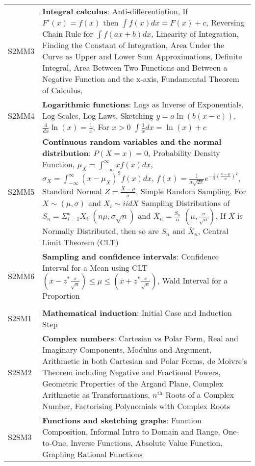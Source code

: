 \documentclass[varwidth=144mm, 12pt]{standalone}
\begin{document}
\begin{longtable}{lp{}}
S2MM3 & \textbf{Integral calculus}: Anti-differentiation, If $F'(x) = f(x)$ then $\int{f(x)dx} = F(x) + c$, Reversing Chain Rule for $\int{f(ax + b)dx}$, Linearity of Integration, Finding the Constant of Integration, Area Under the Curve as Upper and Lower Sum Approximations, Definite Integral, Area Between Two Functions and Between a Negative Function and the x-axis, Fundamental Theorem of Calculus,  \\
S2MM4 & \textbf{Logarithmic functions}: Logs as Inverse of Exponentials, Log-Scales, Log Laws, Sketching $y = a\ln(b(x-c))$, $\frac{d}{dx}\ln(x) = \frac{1}{x}$, For $x > 0$ $\int{\frac{1}{x}dx} = \ln(x) + c$ \\
S2MM5 & \textbf{Continuous random variables and the normal distribution}: $P(X = x) = 0$, Probability Density Function, $\mu_X = \int_{-\infty}^{\infty}{xf(x)dx}$, $\sigma_X = \int_{-\infty}^{\infty}{(x - \mu_X)^2f(x)dx}$, $f(x) = \frac{1}{\sigma\sqrt{2\pi}}e^{-\frac{1}{2}\left( \frac{x-\mu}{\sigma}\right)^2}$, Standard Normal $Z = \frac{X - \mu}{\sigma}$, Simple Random Sampling, For $X \sim (\mu, \sigma)$ and $X_i \sim iid X$ Sampling Distributions of $S_n = \Sigma_{i = 1}^{n}{X_i}$ $(n\mu,\sigma\sqrt{n})$ and $\bar{X}_n = \frac{S_n}{n}$ $(\mu,\frac{\sigma}{\sqrt{n}})$, If $X$ is Normally Distributed, then so are $S_n$ and $\bar{X}_n$, Central Limit Theorem (CLT) \\
S2MM6 & \textbf{Sampling and confidence intervals}: Confidence Interval for a Mean using CLT $\left(\bar{x} - z^*\frac{s}{\sqrt{n}} \right) \leq \mu \leq \left( \bar{x} + z^*\frac{s}{\sqrt{n}}\right)$, Wald Interval for a Proportion  \\
& \\
S2SM1 & \textbf{Mathematical induction}: Initial Case and Induction Step \\
S2SM2 & \textbf{Complex numbers}: Cartesian vs Polar Form, Real and Imaginary Components, Modulus and Argument, Arithmetic in both Cartesian and Polar Forms, de Moivre's Theorem including Negative and Fractional Powers, Geometric Properties of the Argand Plane, Complex Arithmetic as Transformations, $n^{\text{th}}$ Roots of a Complex Number, Factorising Polynomials with Complex Roots \\
S2SM3 & \textbf{Functions and sketching graphs}: Function Composition, Informal Intro to Domain and Range, One-to-One, Inverse Functions, Absolute Value Function, Graphing Rational Functions \\

\end{longtable}
\end{document}
